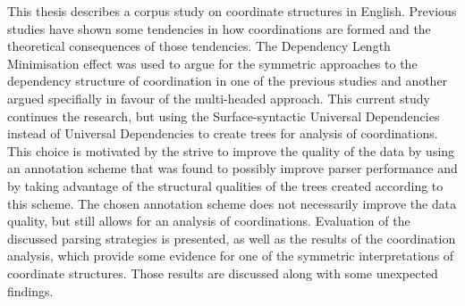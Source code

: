 This thesis describes a corpus study on coordinate structures in English. Previous studies have shown some tendencies in how coordinations are formed and the theoretical consequences of those tendencies. The Dependency Length Minimisation effect was used to argue for the symmetric approaches to the dependency structure of coordination in one of the previous studies and another argued specifially in favour of the multi-headed approach. This current study continues the research, but using the Surface-syntactic Universal Dependencies instead of Universal Dependencies to create trees for analysis of coordinations. This choice is motivated by the strive to improve the quality of the data by using an annotation scheme that was found to possibly improve parser performance and by taking advantage of the structural qualities of the trees created according to this scheme. The chosen annotation scheme does not necessarily improve the data quality, but still allows for an analysis of coordinations. Evaluation of the discussed parsing strategies is presented, as well as the results of the coordination analysis, which provide some evidence for one of the symmetric interpretations of coordinate structures. Those results are discussed along with some unexpected findings.